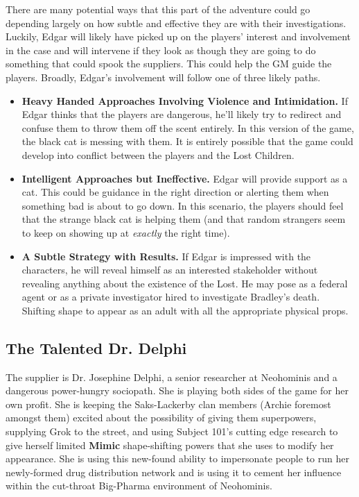 \documentclass[letterpaper,serif]{rpg-module}
\begin{document}
There are many potential ways that this part of the adventure could go depending largely on how subtle and effective they are with their investigations. Luckily, Edgar will likely have picked up on the players' interest and involvement in the case and will intervene if they look as though they are going to do something that could spook the suppliers. This could help the GM guide the players. Broadly, Edgar's involvement will follow one of three likely paths. 

\begin{itemize}
	\item \textbf{Heavy Handed Approaches Involving Violence and Intimidation.} If Edgar thinks that the players are dangerous, he'll likely try to redirect and confuse them to throw them off the scent entirely. In this version of the game, the black cat is messing with them. It is entirely possible that the game could develop into conflict between the players and the Lost Children. 
    \item \textbf{Intelligent Approaches but Ineffective.} Edgar will provide support as a cat. This could be guidance in the right direction or alerting them when something bad is about to go down. In this scenario, the players should feel that the strange black cat is helping them (and that random strangers seem to keep on showing up at \emph{exactly} the right time).
    \item \textbf{A Subtle Strategy with Results.} If Edgar is impressed with the characters, he will reveal himself as an interested stakeholder without revealing anything about the existence of the Lost. He may pose as a federal agent or as a private investigator hired to investigate Bradley's death. Shifting shape to appear as an adult with all the appropriate physical props.
\end{itemize}

\subsection{ The Talented Dr. Delphi }

The supplier is Dr. Josephine Delphi, a senior researcher at Neohominis and a dangerous power-hungry sociopath. She is playing both sides of the game for her own profit. She is keeping the Saks-Lackerby clan members (Archie foremost amongst them) excited about the possibility of giving them superpowers, supplying Grok to the street, and using Subject 101's cutting edge research to give herself limited \textbf{Mimic} shape-shifting powers that she uses to modify her appearance. She is using this new-found ability to impersonate people to run her newly-formed drug distribution network and is using it to cement her influence within the cut-throat Big-Pharma environment of Neohominis.  
\end{document}
